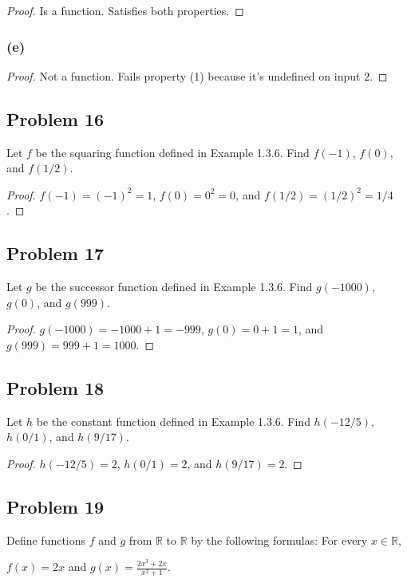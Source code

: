 \documentclass[14pt]{extarticle}
\newcommand{\dps}{\displaystyle}
\newcommand{\R}{\mathbb{R}}
\begin{document}
\begin{proof}
    Is a function. Satisfies both properties.
\end{proof}

\subsubsection{(e)}

\begin{proof}
    Not a function. Fails property (1) because it's undefined on input $2$.
\end{proof}

\subsection{Problem 16}
Let $f$ be the squaring function defined in Example 1.3.6.
Find $f(-1)$, $f(0)$, and $f(1/2)$.

\begin{proof}
    $f(-1) = (-1)^2 = 1$, $f(0) = 0^2 = 0$, and $f(1/2) = (1/2)^2 = 1/4$.
\end{proof}

\subsection{Problem 17}
Let $g$ be the successor function defined in Example 1.3.6.
Find $g(-1000)$, $g(0)$, and $g(999)$.

\begin{proof}
    $g(-1000) = -1000 + 1 = -999$, $g(0) = 0 + 1 = 1$, and $g(999) = 999 + 1 = 1000$.
\end{proof}

\subsection{Problem 18}
Let $h$ be the constant function defined in Example 1.3.6.
Find $h(-12/5),$ $h(0/1)$, and $h(9/17)$.

\begin{proof}
    $h(-12/5) = 2$, $h(0/1) = 2$, and $h(9/17) = 2$.
\end{proof}

\subsection{Problem 19}
Define functions $f$ and $g$ from $\R$ to $\R$ by the following formulas:
For every $x \in \R$,

\begin{center}
    $f(x) = 2x$ and $\dps g(x) = \frac{2x^3 + 2x}{x^2 + 1}$.
\end{center}
\end{document}
